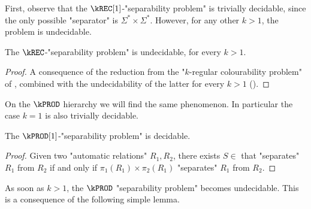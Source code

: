 First, observe that the $\kREC[1]$-"separability problem" is trivially decidable, since the only possible "separator" is $\Sigma^* \times \Sigma^*$. However, for any other $k>1$, the problem is undecidable.

\begin{proposition}
    The $\kREC$-"separability problem" is undecidable, for every $k>1$.
\end{proposition}
\begin{proof}
A consequence of the reduction from the "$k$-regular colourability problem" of , combined with the undecidability of the latter for every $k>1$ ().
\end{proof}

On the $\kPROD$ hierarchy we will find the same phenomenon. In particular the case $k=1$ is also trivially decidable.

\begin{proposition}
    The $\kPROD[1]$-"separability problem" is decidable.
\end{proposition}
\begin{proof}
    Given two "automatic relations" $R_1, R_2$, there exists $S \in $ \kPROD[1]
    that "separates" $R_1$ from $R_2$ if and only if $\pi_1(R_1)\times \pi_2(R_1)$
    "separates" $R_1$ from $R_2$.
\end{proof}

As soon as $k>1$, the $\kPROD$ "separability problem" becomes undecidable. This is a consequence of the following simple lemma.

